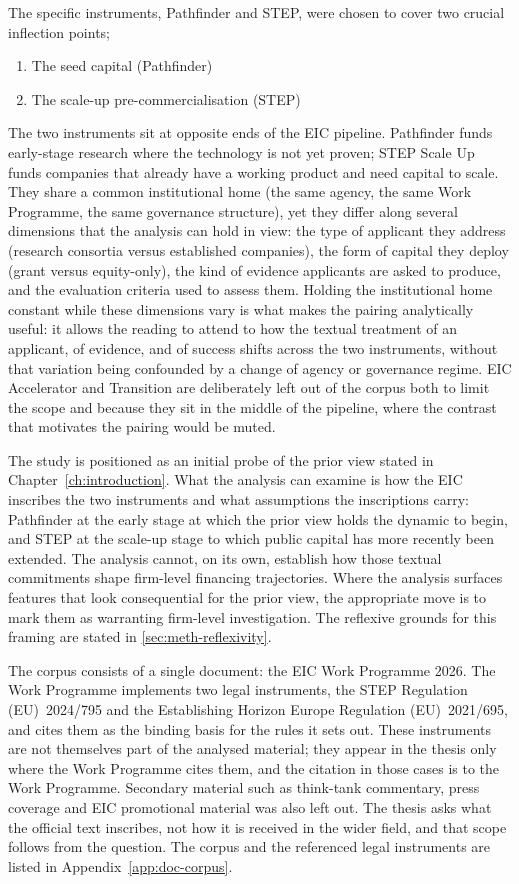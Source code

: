 The specific instruments, Pathfinder and STEP, were chosen to cover two
crucial inflection points;

\begin{enumerate}[leftmargin=*]
    \item The seed capital (Pathfinder)
    \item The scale-up pre-commercialisation (STEP)
\end{enumerate}

The two instruments sit at opposite ends of the EIC pipeline. Pathfinder
funds early-stage research where the technology is not yet proven; STEP
Scale Up funds companies that already have a working product and need
capital to scale. They share a common institutional home (the same
agency, the same Work Programme, the same governance structure), yet
they differ along several dimensions that the analysis can hold in
view: the type of applicant they address (research consortia versus
established companies), the form of capital they deploy (grant versus
equity-only), the kind of evidence applicants are asked
to produce, and the evaluation criteria used to assess them. Holding
the institutional home constant while these dimensions vary is what
makes the pairing analytically useful: it allows the reading to attend
to how the textual treatment of an applicant, of evidence, and of
success shifts across the two instruments, without that variation
being confounded by a change of agency or governance regime. EIC
Accelerator and Transition are deliberately left out of the corpus
both to limit the scope and because they sit in the middle of the
pipeline, where the contrast that motivates the pairing would be
muted.

The study is positioned as an initial probe of the prior view stated
in Chapter~\ref{ch:introduction}. What the analysis can examine is
how the EIC inscribes the two instruments and what assumptions the
inscriptions carry: Pathfinder at the early stage at which the prior
view holds the dynamic to begin, and STEP at the scale-up stage to
which public capital has more recently been extended. The analysis
cannot, on its own, establish how those textual commitments shape
firm-level financing trajectories. Where the analysis surfaces
features that look consequential for the prior view, the appropriate
move is to mark them as warranting firm-level investigation. The
reflexive grounds for this framing are stated in
\cref{sec:meth-reflexivity}.

The corpus consists of a single document: the EIC Work Programme 2026.
The Work Programme implements two legal instruments, the STEP
Regulation (EU)~2024/795 and the Establishing Horizon Europe
Regulation (EU)~2021/695, and cites them as the binding basis for
the rules it sets out. These instruments are not themselves part of
the analysed material; they appear in the thesis only where the Work
Programme cites them, and the citation in those cases is to the Work
Programme. Secondary material such as think-tank commentary, press
coverage and EIC promotional material was also left out. The thesis
asks what the official text inscribes, not how it is received in the
wider field, and that scope follows from the question. The corpus and
the referenced legal instruments are listed in
Appendix~\ref{app:doc-corpus}.

